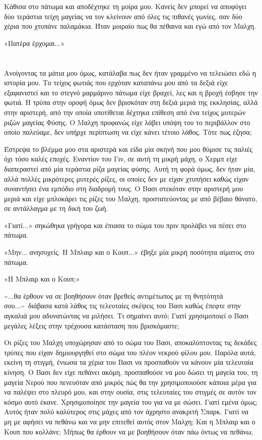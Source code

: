 \documentclass[12pt,twoside, openany]{book}
\begin{document}
Κάθισα στο πάτωμα και αποδέχτηκε τη μοίρα μου. Κανείς δεν μπορεί να αποφύγει δύο τεράστια τείχη μαγείας να τον κλείνουν από όλες τις πιθανές γωνίες, σαν δύο χέρια που χτυπάνε παλαμάκια. Ήταν μοιραίο πως θα πέθαινα και εγώ από τον Μαλχη.

«Πατέρα έρχομαι...»

\chapter{}

Ανοίγοντας τα μάτια μου όμως, κατάλαβα πως δεν ήταν γραμμένο να τελειώσει εδώ η ιστορία μου. Το τείχος φωτιάς που ερχόταν καταπάνω μου από τα δεξιά είχε εξαφανιστεί και το στεγνό μαρμάρινο πάτωμα είχε βραχεί, λες και η βροχή έσβησε την φωτιά. Η τρύπα στην οροφή όμως δεν βρισκόταν στη δεξιά μεριά της εκκλησίας, αλλά στην αριστερή, από την οποία υποτίθεται δέχτηκα επίθεση από ένα τείχος μυτερών ριζών μαγείας Φύσης. Ο Μαλχη προφανώς είχε λάβει υπόψη του το περιβάλλον στο οποίο παλεύαμε, δεν υπήρχε περίπτωση να είχε κάνει τέτοιο λάθος. Τότε πως έζησα;

Έστρεψα το βλέμμα μου στα αριστερά και είδα μία σκηνή που μου θύμισε τις παλιές όχι τόσο καλές εποχές. Εναντίον του Γιν, σε αυτή τη μικρή μάχη, ο Χερμπ είχε διαπεραστεί από μία τεράστια ρίζα μαγείας φύσης. Αυτή τη φορά όμως, δεν ήταν μία, αλλά πολλές μικρότερες μυτερές ρίζες, οι οποίες δεν με είχαν χτυπήσει καθώς είχαν συναντήσει ένα εμπόδιο στη διαδρομή τους. Ο Βασι στεκόταν στην αριστερή μου μεριά και είχε μπλοκάρει τις ρίζες του Μαλχη, προστατεύοντας με από βέβαιο θάνατο, σε αντάλλαγμα με τη δική του ζωή.

«Γιατί...» σηκώθηκα γρήγορα και έπιασα το σώμα του πριν προλάβει να πέσει στο πάτωμα.

«Μην... ανησυχείς. Η Μπλαιρ και ο Κουπ...» έβηξε μία μικρή ποσότητα αίματος στο πάτωμα.

«Η Μπλαιρ και ο Κουπ;»

\textasciitilde ...θα έρθουν να σε βοηθήσουν όταν βρεθείς αντιμέτωπος με τη θνητότητά σου...\textasciitilde \  διάβασα κατά λάθος τις τελευταίες σκέψεις του Βασι καθώς έπεφτε στην αγκαλιά μου αδυνατώντας να μιλήσει. Τι σημαίνει αυτό; Γιατί χρησιμοποιεί ο Βασι μεγάλες λέξεις στην τρέχουσα κατάσταση που βρισκόμαστε;

Οι ρίζες του Μαλχη υποχώρησαν από το σώμα του Βασι, αποκαλύπτοντας τις δεκάδες τρύπες που είχαν δημιουργηθεί στο σώμα του πλέον νεκρού φίλου μου. Παρόλα αυτά, εκείνη τη στιγμή, ένιωσα τα χέρια του Βασι να προσπαθούν να κάνουν μία τελευταία κίνηση. Ο Βασι δεν είχε πεθάνει ακόμη, προσπαθούσε να μου δώσει τη μαγεία του, τη μαγεία Νερού που πενευόταν από μικρός πώς θα την χρησιμοποιούσε κάποια μέρα για να παλέψει στο πλευρό μου, και στην ουσία, στις τελευταίες του στιγμές σε αυτόν τον κόσμο αυτό έκανε. Χρησιμοποίησε την μαγεία του για να με σώσει.  Γιατί εμένα όμως; Αυτός ήταν πολύ καλύτερος στις μάχες από τον άχρηστο ανακριτή Σπαρκ. Γιατί να μη με αφήσει να πεθάνω και να μην επιτεθεί αυτός στον Μαλχη; Και η Μπλαιρ και ο Κουπ που κολλάνε; Μήπως θα έρθουν να με βοηθήσουν όταν πάω όντως να πεθάνω;
\end{document}
